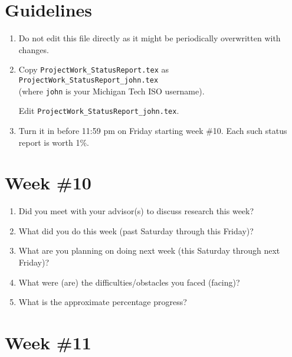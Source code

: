 \documentclass[letterpaper,12pt,fleqn]{article}
\begin{document}
\thispagestyle{empty}

\statustitle

\section*{Guidelines}

\begin{enumerate}
  \item Do not edit this file directly as it might be periodically
        overwritten with changes.
  \item Copy \texttt{ProjectWork\_StatusReport.tex} as 
        \texttt{ProjectWork\_StatusReport\_john.tex}\\
        (where \texttt{john} is your Michigan Tech ISO username).

        Edit  \texttt{ProjectWork\_StatusReport\_john.tex}.
  \item Turn it in before 11:59 pm on Friday starting week \#10. Each such
        status report is worth 1\%.
\end{enumerate}

\clearpage
\section*{Week \#10}

\begin{spacing}{1.50}
  \begin{enumerate}
    \item Did you meet with your advisor(s) to discuss research this week?
          \vfill

    \item What did you do this week (past Saturday through this Friday)? 
          \vfill

    \item What are you planning on doing next week (this Saturday through next Friday)? 
          \vfill

    \item What were (are) the difficulties/obstacles you faced (facing)?
          \vfill

    \item What is the approximate percentage progress?
          \vfill
  \end{enumerate}
\end{spacing}

\clearpage
\section*{Week \#11}
\end{document}

